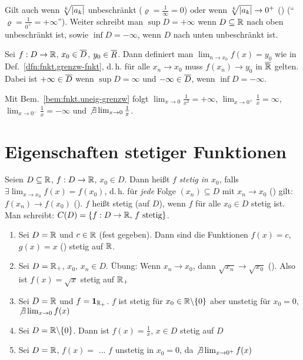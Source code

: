 \documentclass[12pt]{scrreprt}
\begin{document}
\noindent Gilt auch wenn $\sqrt[k]{\left\lvert a_k\right\lvert}$ unbeschränkt ($\varrho = \frac{1}{\infty} = 0$) oder wenn $\sqrt[k]{\left\lvert a_k\right\lvert} \to 0^+$ (\kinf)
("`$\varrho = \frac{1}{0^+} = +\infty$"'). Weiter schreibt man $\sup D = +\infty$ wenn $D\subseteq\mathbb{R}$ nach oben unbeschränkt
ist, sowie $\inf D= -\infty$, wenn $D$ nach unten unbeschränkt ist.

Sei $f: D\rightarrow\mathbb{R}$, $x_0\in\overline{D}$, $y_0\in\overline{R}$. Dann definiert man $\lim_{n\to x_0} f(x) = y_0$ wie in Def.~\ref{dfn:fnkt.grenzw-fnkt},
d.\,h. für alle $x_n \to x_0$ muss $f(x_n)\to y_0$ in $\overline{\mathbb{R}}$ gelten. Dabei ist $+\infty\in\overline{D}$ wenn $\sup D = \infty$ und
$-\infty \in \overline{D}$, wenn $\inf D = -\infty$.

\begin{bsp*}
Mit Bem.~\ref{bem:fnkt.uneig-grenzw} folgt $\lim_{x\to 0}\frac{1}{x^2} = +\infty$, $\lim_{x\to 0^+}\frac{1}{x} = \infty$,
$\lim_{x\to 0^-}\frac{1}{x} = -\infty$ und $\not\exists\lim_{x\to 0}\frac{1}{x}$.
\end{bsp*}

\section{Eigenschaften stetiger Funktionen}
\label{sec:fnkt.stetige-fnkt}

\begin{dfn}\label{dfn:fnkt.stetigkeit}
Seien $D \subseteq\mathbb{R}$, $f: D\rightarrow\mathbb{R}$, $x_0\in D$. Dann heißt $f$ \emph{stetig in $x_0$}, falls 
$\exists \lim_{x\to x_0} f(x) = f(x_0)$, d.\,h. für \emph{jede} Folge $(x_n) \subseteq D$ mit $x_n \to x_0$
(\ninf) gilt: $f(x_n) \to f(x_0)$ (\ninf). $f$ heißt stetig (auf $D$), wenn $f$ für alle $x_0\in D$ stetig ist.
Man schreibt: $C(D) = \{f: D\rightarrow \mathbb{R}\text{, $f$ stetig}\}$.
\end{dfn}

\begin{bsp}\label{bsp:fnkt.stetigkeit}
\begin{enumerate}
\item Sei $D=\mathbb{R}$ und $c\in\mathbb{R}$ (fest gegeben). Dann sind die Funktionen $f(x)=c$, $g(x)=x$
() stetig auf $\mathbb{R}$.\label{bsp:fnkt.stetigkeit.a}
\item Sei $D=\mathbb{R}_+$, $x_0$, $x_n\in D$. Übung: Wenn $x_n\to x_0$, dann $\sqrt{x_n}\to\sqrt{x_0}$
(\ninf). Also ist $f(x) = \sqrt{x}$ stetig auf $\mathbb{R}_+$\label{bsp:fnkt.stetigkeit.b}
\item Sei $D=\mathbb{R}$ und $f=\mathbf{1}_{\mathbb{R}_+}$. \folgt $f$ ist stetig für $x_0\in\mathbb{R}\backslash\{0\}$
aber unstetig für $x_0 = 0$, $\not\exists\lim_{x\to 0} f(x)$\label{bsp:fnkt.stetigkeit.c}
\item Sei $D=\mathbb{R}\backslash\{0\}$. Dann ist $f(x) = \frac{1}{x}$, $x\in D$ stetig auf $D$\label{bsp:fnkt.stetigkeit.d}
\item Sei $D=\mathbb{R}$, $f(x) = $ ...%
\folgt $f$ unstetig in $x_0=0$, da $\not\exists\lim_{x\to 0^+} f(x)$\label{bsp:fnkt.stetigkeit.e}
\end{enumerate}
\end{bsp}
\end{document}
